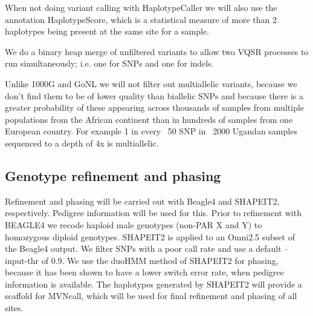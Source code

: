 When not doing variant calling with HaplotypeCaller we will also use the annotation HaplotypeScore, which is a statistical measure of more than 2 haplotypes being present at the same site for a sample.

We do a binary heap merge of unfiltered variants to allow two VQSR processes to run simultaneously; i.e. one for SNPs and one for indels.

Unlike 1000G and GoNL we will not filter out multiallelic variants, because we don't find them to be of lower quality than biallelic SNPs and because there is a greater probability of these appearing across thousands of samples from multiple populations from the African continent than in hundreds of samples from one European country. For example 1 in every ~50 SNP in ~2000 Ugandan samples sequenced to a depth of 4x is multiallelic.

\subsection{Genotype refinement and phasing}
Refinement and phasing will be carried out with Beagle4 and SHAPEIT2, respectively. Pedigree  information will be used for this. Prior to refinement with BEAGLE4 we recode haploid male genotypes (non-PAR X and Y) to homozygous diploid genotypes. SHAPEIT2 is applied to an Omni2.5 subset of the Beagle4 output. We filter SNPs with a poor call rate and use a default --input-thr of 0.9. We use the duoHMM method of SHAPEIT2 for phasing, because it has been shown to have a lower switch error rate, when pedigree information is available.\cite{OConnell2014} The haplotypes generated by SHAPEIT2 will provide a scaffold for MVNcall, which will be used for final refinement and phasing of all sites.
